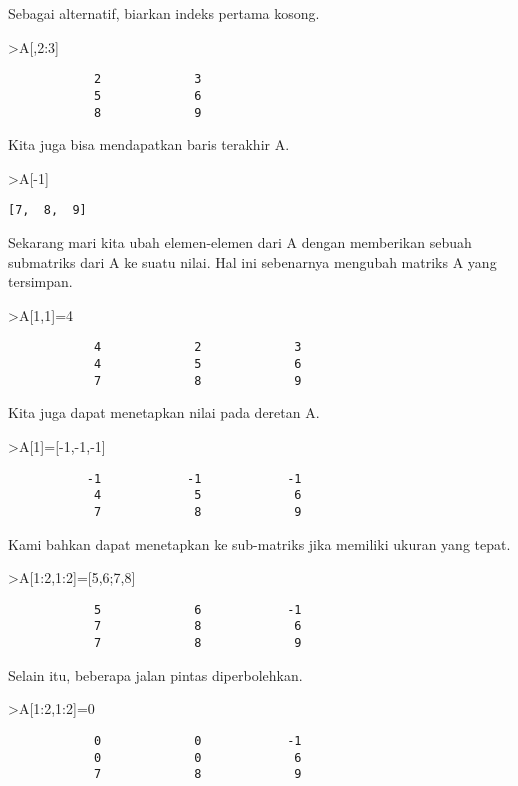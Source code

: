 \documentclass[
]{book}
\begin{document}
Sebagai alternatif, biarkan indeks pertama kosong.

\textgreater A{[},2:3{]}

\begin{verbatim}
            2             3 
            5             6 
            8             9 
\end{verbatim}

Kita juga bisa mendapatkan baris terakhir A.

\textgreater A{[}-1{]}

\begin{verbatim}
[7,  8,  9]
\end{verbatim}

Sekarang mari kita ubah elemen-elemen dari A dengan memberikan sebuah submatriks dari A ke suatu nilai. Hal ini sebenarnya mengubah matriks A yang tersimpan.

\textgreater A{[}1,1{]}=4

\begin{verbatim}
            4             2             3 
            4             5             6 
            7             8             9 
\end{verbatim}

Kita juga dapat menetapkan nilai pada deretan A.

\textgreater A{[}1{]}={[}-1,-1,-1{]}

\begin{verbatim}
           -1            -1            -1 
            4             5             6 
            7             8             9 
\end{verbatim}

Kami bahkan dapat menetapkan ke sub-matriks jika memiliki ukuran yang tepat.

\textgreater A{[}1:2,1:2{]}={[}5,6;7,8{]}

\begin{verbatim}
            5             6            -1 
            7             8             6 
            7             8             9 
\end{verbatim}

Selain itu, beberapa jalan pintas diperbolehkan.

\textgreater A{[}1:2,1:2{]}=0

\begin{verbatim}
            0             0            -1 
            0             0             6 
            7             8             9 
\end{verbatim}
\end{document}
